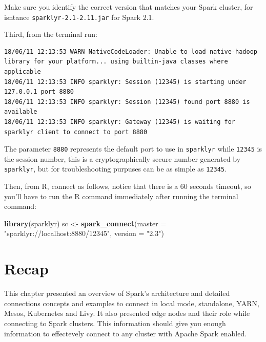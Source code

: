 \documentclass[]{book}
\newenvironment{Shaded}{\begin{snugshade}}{\end{snugshade}}
\newcommand{\DataTypeTok}[1]{\textcolor[rgb]{0.13,0.29,0.53}{#1}}
\newcommand{\ExtensionTok}[1]{#1}
\newcommand{\KeywordTok}[1]{\textcolor[rgb]{0.13,0.29,0.53}{\textbf{#1}}}
\newcommand{\NormalTok}[1]{#1}
\newcommand{\StringTok}[1]{\textcolor[rgb]{0.31,0.60,0.02}{#1}}
\newcommand{\VariableTok}[1]{\textcolor[rgb]{0.00,0.00,0.00}{#1}}
\theoremstyle{definition}
\theoremstyle{definition}
\theoremstyle{definition}
\theoremstyle{remark}
\begin{document}
Make sure you identify the correct version that matches your Spark
cluster, for isntance \texttt{sparklyr-2.1-2.11.jar} for Spark 2.1.

Third, from the terminal run:

\begin{Shaded}
\end{Shaded}

\begin{verbatim}
18/06/11 12:13:53 WARN NativeCodeLoader: Unable to load native-hadoop library for your platform... using builtin-java classes where applicable
18/06/11 12:13:53 INFO sparklyr: Session (12345) is starting under 127.0.0.1 port 8880
18/06/11 12:13:53 INFO sparklyr: Session (12345) found port 8880 is available
18/06/11 12:13:53 INFO sparklyr: Gateway (12345) is waiting for sparklyr client to connect to port 8880
\end{verbatim}

The parameter \texttt{8880} represents the default port to use in
\texttt{sparklyr} while \texttt{12345} is the session number, this is a
cryptographically secure number generated by \texttt{sparklyr}, but for
troubleshooting purpuses can be as simple as \texttt{12345}.

Then, from R, connect as follows, notice that there is a 60 seconds
timeout, so you'll have to run the R command immediately after running
the terminal command:

\begin{Shaded}
\begin{Highlighting}[]
\KeywordTok{library}\NormalTok{(sparklyr)}
\NormalTok{sc <-}\StringTok{ }\KeywordTok{spark_connect}\NormalTok{(}\DataTypeTok{master =} \StringTok{"sparklyr://localhost:8880/12345"}\NormalTok{, }\DataTypeTok{version =} \StringTok{"2.3"}\NormalTok{)}
\end{Highlighting}
\end{Shaded}

\hypertarget{recap-2}{%
\section{Recap}\label{recap-2}}

This chapter presented an overview of Spark's architecture and detailed
connections concepts and examples to connect in local mode, standalone,
YARN, Mesos, Kubernetes and Livy. It also presented edge nodes and their
role while connecting to Spark clusters. This information should give
you enough information to effectevely connect to any cluster with Apache
Spark enabled.
\end{document}
